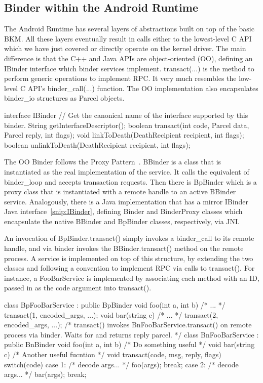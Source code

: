 \documentclass[prodmode]{acmlarge}
\begin{document}
\subsection{Binder within the Android Runtime}
The Android Runtime has several layers of abstractions built on top of the basic BKM. All these layers eventually result in calls either to the lowest-level C API which we have just covered or directly operate on the kernel driver. The main difference is that the C++ and Java APIs are object-oriented (OO), defining an IBinder interface which binder services implement. transact(...) is the method to perform generic operations to implement RPC. It very much resembles the low-level C API's binder\_call(...) function. The OO implementation also encapsulates binder\_io structures as Parcel objects.

\begin{snippet}[label=snip:IBinder]
interface IBinder {
  // Get the canonical name of the interface supported by this binder.
  String getInterfaceDescriptor();
  boolean transact(int code, Parcel data, Parcel reply, int flags);
  void linkToDeath(DeathRecipient recipient, int flags);
  boolean unlinkToDeath(DeathRecipient recipient, int flags);
}
\end{snippet}

The OO Binder follows the Proxy Pattern~\cite{ProxyPattern}. BBinder is a class that is instantiated as the real implementation of the service. It calls the equivalent of binder\_loop and accepts transaction requests. Then there is BpBinder which is a proxy class that is instantiated with a remote handle to an active BBinder service. Analogously, there is a Java implementation that has a mirror IBinder Java interface~\ref{snip:IBinder}, defining Binder and BinderProxy classes which encapsulate the native BBinder and BpBinder classes, respectively, via JNI.

An invocation of BpBinder.transact() simply invokes a binder\_call to its remote handle, and via binder invokes the BBinder.transact() method on the remote process. A service is implemented on top of this structure, by extending the two classes and following a convention to implement RPC via calls to transact(). For instance, a FooBarService is implemented by associating each method with an ID, passed in as the code argument into transact().

\begin{snippet}
class BpFooBarService : public BpBinder {
  void foo(int a, int b) { /* ... */ transact(1, encoded_args, ...); }
  void bar(string c) { /* ... */ transact(2, encoded_args, ...); }
  /* transact() invokes BnFooBarService.transact() on remote process
     via binder. Waits for and returns reply parcel. */
}
class BnFooBarService : public BnBinder {
  void foo(int a, int b) { /* Do something useful */ }
  void bar(string c) { /* Another useful fucntion */ }
  void transact(code, msg, reply, flags) {
    switch(code) {
      case 1: /* decode args... */ foo(args); break;
      case 2: /* decode args... */ bar(args); break;
}}}
\end{snippet}
\end{document}
